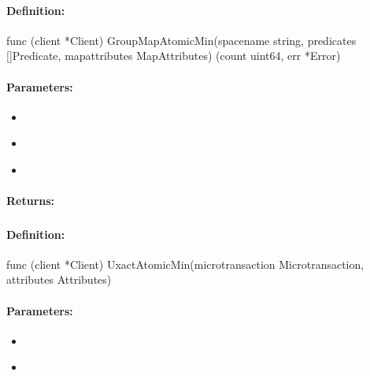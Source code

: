 \paragraph{Definition:}
\begin{gocode}
func (client *Client) GroupMapAtomicMin(spacename string, predicates []Predicate, mapattributes MapAttributes) (count uint64, err *Error)
\end{gocode}

\paragraph{Parameters:}
\begin{itemize}[noitemsep]
\item {}\\

\item {}\\

\item {}\\

\end{itemize}

\paragraph{Returns:}


\pagebreak
\subsubsection{}
\label{api:Go:UxactAtomicMin}


\paragraph{Definition:}
\begin{gocode}
func (client *Client) UxactAtomicMin(microtransaction Microtransaction, attributes Attributes)
\end{gocode}

\paragraph{Parameters:}
\begin{itemize}[noitemsep]
\item {}\\

\item {}\\

\end{itemize}

